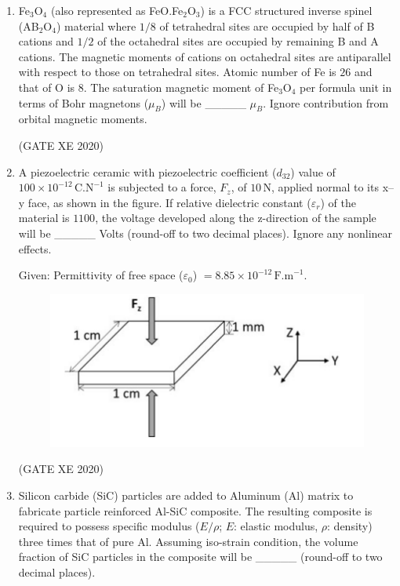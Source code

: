 \documentclass[12pt]{article}
\begin{document}
\begin{enumerate}
(GATE XE 2020)

\item Fe$_3$O$_4$ (also represented as FeO.Fe$_2$O$_3$) is a FCC structured inverse spinel (AB$_2$O$_4$) material where $1/8$ of tetrahedral sites are occupied by half of B cations and $1/2$ of the octahedral sites are occupied by remaining B and A cations. The magnetic moments of cations on octahedral sites are antiparallel with respect to those on tetrahedral sites. Atomic number of Fe is $26$ and that of O is $8$. The saturation magnetic moment of Fe$_3$O$_4$ per formula unit in terms of Bohr magnetons ($\mu_B$) will be \_\_\_\_\_ $\mu_B$. Ignore contribution from orbital magnetic moments.  

(GATE XE 2020)

\item A piezoelectric ceramic with piezoelectric coefficient ($d_{32}$) value of $100 \times 10^{-12} \,\text{C.N}^{-1}$ is subjected to a force, $F_z$, of $10 \,\text{N}$, applied normal to its x–y face, as shown in the figure. If relative dielectric constant ($\varepsilon_r$) of the material is $1100$, the voltage developed along the z-direction of the sample will be \_\_\_\_\_ Volts (round-off to two decimal places). Ignore any nonlinear effects.  

Given: Permittivity of free space ($\varepsilon_0$) $= 8.85 \times 10^{-12}\,\text{F.m}^{-1}$.  

\begin{figure}[H]
    \centering
    \includegraphics[width=0.5\columnwidth]{figs/ass4_c_q19.png}
    \caption{}
    \label{fig:placeholder}
\end{figure}

(GATE XE 2020)

\item Silicon carbide (SiC) particles are added to Aluminum (Al) matrix to fabricate particle reinforced Al-SiC composite. The resulting composite is required to possess specific modulus ($E/\rho$; $E$: elastic modulus, $\rho$: density) three times that of pure Al. Assuming iso-strain condition, the volume fraction of SiC particles in the composite will be \_\_\_\_\_ (round-off to two decimal places).


\end{enumerate}
\end{document}
